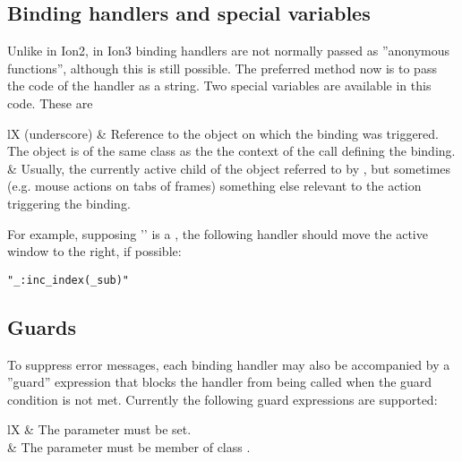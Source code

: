 \subsection{Binding handlers and special variables}

Unlike in Ion2, in Ion3 binding handlers are not normally passed as
''anonymous functions'', although this is still possible. The preferred
method now is to pass the code of the handler as a string. Two special 
variables are available in this code. These are

\begin{tabularx}{\linewidth}{lX}
    \code{_} (underscore) &
      Reference to the object on which the 
      binding was triggered. The object is of the same class as the the
      context of the  call
      defining the binding. \\
     &
      Usually, the currently active child of the 
      object referred to by \code{_}, but sometimes (e.g. mouse actions
      on tabs of frames) something else relevant to the action triggering
      the binding. \\
\end{tabularx}

For example, supposing '\code{_}' is a , the following
handler should move the active window to the right, if possible:

\begin{verbatim}
"_:inc_index(_sub)"
\end{verbatim}

\subsection{Guards}

To suppress error messages, each binding handler may also be accompanied
by a ''guard'' expression that blocks the handler from being called when
the guard condition is not met. Currently the following guard expressions
are supported:

\begin{tabularx}{\linewidth}{lX}
     & The  parameter must be set. \\
     & The  parameter must be member
      of class . \\
\end{tabularx}


